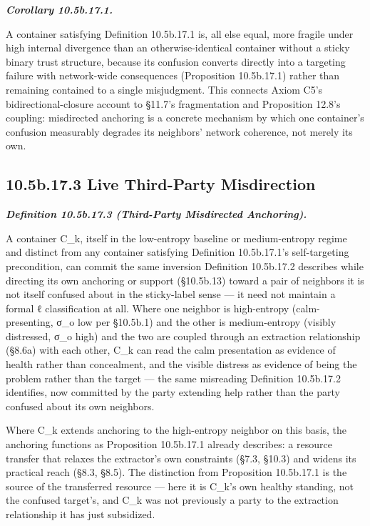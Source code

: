 \documentclass[
]{article}
\begin{document}
\emph{\textbf{Corollary 10.5b.17.1.}}

A container satisfying Definition 10.5b.17.1 is, all else equal, more
fragile under high internal divergence than an otherwise-identical
container without a sticky binary trust structure, because its confusion
converts directly into a targeting failure with network-wide
consequences (Proposition 10.5b.17.1) rather than remaining contained to
a single misjudgment. This connects Axiom C5's bidirectional-closure
account to §11.7's fragmentation and Proposition 12.8's coupling:
misdirected anchoring is a concrete mechanism by which one container's
confusion measurably degrades its neighbors' network coherence, not
merely its own.

\hypertarget{b.17.3-live-third-party-misdirection}{%
\subsection{10.5b.17.3 Live Third-Party
Misdirection}\label{b.17.3-live-third-party-misdirection}}

\emph{\textbf{Definition 10.5b.17.3 (Third-Party Misdirected
Anchoring).}}

A container C\_k, itself in the low-entropy baseline or medium-entropy
regime and distinct from any container satisfying Definition
10.5b.17.1's self-targeting precondition, can commit the same inversion
Definition 10.5b.17.2 describes while directing its own anchoring or
support (§10.5b.13) toward a pair of neighbors it is not itself confused
about in the sticky-label sense --- it need not maintain a formal ℓ
classification at all. Where one neighbor is high-entropy
(calm-presenting, σ\_o low per §10.5b.1) and the other is medium-entropy
(visibly distressed, σ\_o high) and the two are coupled through an
extraction relationship (§8.6a) with each other, C\_k can read the calm
presentation as evidence of health rather than concealment, and the
visible distress as evidence of being the problem rather than the target
--- the same misreading Definition 10.5b.17.2 identifies, now committed
by the party extending help rather than the party confused about its own
neighbors.

Where C\_k extends anchoring to the high-entropy neighbor on this basis,
the anchoring functions as Proposition 10.5b.17.1 already describes: a
resource transfer that relaxes the extractor's own constraints (§7.3,
§10.3) and widens its practical reach (§8.3, §8.5). The distinction from
Proposition 10.5b.17.1 is the source of the transferred resource ---
here it is C\_k's own healthy standing, not the confused target's, and
C\_k was not previously a party to the extraction relationship it has
just subsidized.
\end{document}
